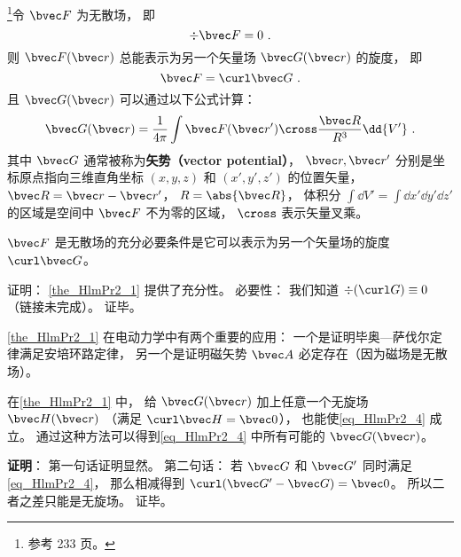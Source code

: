 
\begin{issues}
\issueTODO
\end{issues}


\begin{theorem}{}\label{the_HlmPr2_1}
\footnote{参考 \cite{GriffE} 233 页。}令 $\bvec F$ 为无散场， 即
\begin{equation}
\div \bvec F = 0~.
\end{equation}
则 $\bvec F(\bvec r)$ 总能表示为另一个矢量场 $\bvec G(\bvec r)$ 的旋度， 即
\begin{equation}\label{eq_HlmPr2_4}
\bvec F = \curl \bvec G~.
\end{equation}
且 $\bvec G(\bvec r)$ 可以通过以下公式计算：
\begin{equation}\label{eq_HlmPr2_1}
\bvec G(\bvec r) = \frac{1}{4\pi}\int \bvec F(\bvec r') \cross \frac{\bvec R}{R^3} \dd{V'}~.
\end{equation}
其中 $\bvec G$ 通常被称为\textbf{矢势（vector potential）}， $\bvec r, \bvec r'$ 分别是坐标原点指向三维直角坐标 $(x, y, z)$ 和 $(x', y', z')$ 的位置矢量， $\bvec R = \bvec r - \bvec r'$， $R = \abs{\bvec R}$， 体积分 $\int\dd{V'} = \int\dd{x'}\dd{y'}\dd{z'}$ 的区域是空间中 $\bvec F$ 不为零的区域， $\cross$ 表示矢量叉乘。
\end{theorem}

\begin{corollary}{}
$\bvec F$ 是无散场的充分必要条件是它可以表示为另一个矢量场的旋度 $\curl \bvec G$。
\end{corollary}
证明： \autoref{the_HlmPr2_1} 提供了充分性。 必要性： 我们知道 $\div (\curl G) \equiv 0$ （链接未完成）。 证毕。

\autoref{the_HlmPr2_1} 在电动力学中有两个重要的应用： 一个是证明毕奥—萨伐尔定律满足安培环路定律， 另一个是证明磁矢势 $\bvec A$ 必定存在（因为磁场是无散场）。

\begin{corollary}{}\label{cor_HlmPr2_1}
在\autoref{the_HlmPr2_1} 中， 给 $\bvec G(\bvec r)$ 加上任意一个无旋场 $\bvec H(\bvec r)$ （满足 $\curl \bvec H = \bvec 0$）， 也能使\autoref{eq_HlmPr2_4} 成立。 通过这种方法可以得到\autoref{eq_HlmPr2_4} 中所有可能的 $\bvec G(\bvec r)$。
\end{corollary}
\textbf{证明}： 第一句话证明显然。 第二句话： 若 $\bvec G$ 和 $\bvec G'$ 同时满足\autoref{eq_HlmPr2_4}， 那么相减得到 $\curl (\bvec G' - \bvec G) = \bvec 0$。 所以二者之差只能是无旋场。 证毕。


